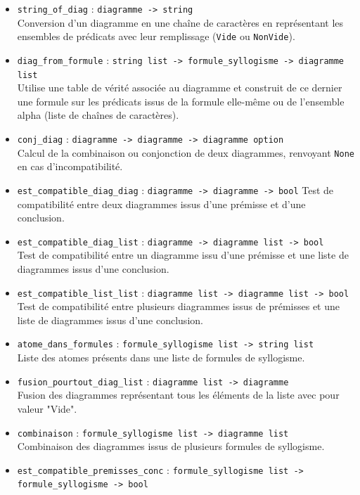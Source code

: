 \documentclass{article}
\begin{document}
\begin{itemize}
\item
\texttt{string\_of\_diag} : \texttt{diagramme -> string} \\
Conversion d'un diagramme en une chaîne de caractères en représentant les ensembles de prédicats avec leur remplissage (\texttt{Vide} ou \texttt{NonVide}).
\item
\texttt{diag\_from\_formule} : \texttt{string list -> formule\_syllogisme -> diagramme list} \\
Utilise une table de vérité associée au diagramme et construit de ce dernier une formule sur les prédicats issus de la formule elle-même ou de l'ensemble alpha (liste de chaînes de caractères).
\item
\texttt{conj\_diag} : \texttt{diagramme -> diagramme -> diagramme option} \\
Calcul de la combinaison ou conjonction de deux diagrammes, renvoyant \texttt{None} en cas d'incompatibilité.
\item
\texttt{est\_compatible\_diag\_diag} : \texttt{diagramme -> diagramme -> bool} 
Test de compatibilité entre deux diagrammes issus d'une prémisse et d'une conclusion.
\item
\texttt{est\_compatible\_diag\_list} : \texttt{diagramme -> diagramme list -> bool} \\
Test de compatibilité entre un diagramme issu d'une prémisse et une liste de diagrammes issus d'une conclusion.
\item
\texttt{est\_compatible\_list\_list} : \texttt{diagramme list -> diagramme list -> bool} \\
Test de compatibilité entre plusieurs diagrammes issus de prémisses et une liste de diagrammes issus d'une conclusion.
\item
\texttt{atome\_dans\_formules} : \texttt{formule\_syllogisme list -> string list} \\
Liste des atomes présents dans une liste de formules de syllogisme.
\item
\texttt{fusion\_pourtout\_diag\_list} : \texttt{diagramme list -> diagramme} \\
Fusion des diagrammes représentant tous les éléments de la liste avec pour valeur "Vide".
\item
\texttt{combinaison} : \texttt{formule\_syllogisme list -> diagramme list} \\
Combinaison des diagrammes issus de plusieurs formules de syllogisme.
\item
\texttt{est\_compatible\_premisses\_conc} : \texttt{formule\_syllogisme list -> formule\_syllogisme -> bool} \\

\end{itemize}
\end{document}
